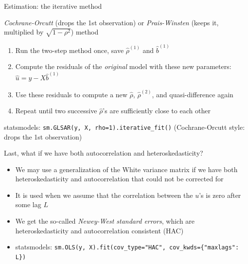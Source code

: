 \documentclass[aspectratio=169]{beamer}
\begin{document}
\begin{frame}{Estimation: the iterative method}

\textit{Cochrane-Orcutt} (drops the 1st observation) or \textit{Prais-Winsten} (keeps it, multiplied by $\sqrt{1-\rho^2}$) method

\begin{enumerate}
    \item Run the two-step method once, save $\hat{\rho}^{(1)}$ and $\hat{b}^{(1)}$
    \item Compute the residuals of the \textit{original} model with these new parameters: $\hat{u} = y - X\hat{b}^{(1)}$
    \item Use these residuals to compute a new $\hat{\rho}$, $\hat{\rho}^{(2)}$, and quasi-difference again
    \item Repeat until two successive $\hat{\rho}$'s are sufficiently close to each other
\end{enumerate}

statsmodels: \texttt{sm.GLSAR(y, X, rho=1).iterative\_fit()} (Cochrane-Orcutt style: drops the 1st observation)

\end{frame}

\begin{frame}{Last, what if we have both autocorrelation and heteroskedasticity?}

\begin{itemize}
    \item We may use a generalization of the White variance matrix if we have both heteroskedasticity and autocorrelation that could not be corrected for
    \item It is used when we assume that the correlation between the $u$'s is zero after some lag $L$
    \item We get the so-called \textit{Newey-West standard errors}, which are heteroskedasticity and autocorrelation consistent (HAC)
    \item statsmodels: \texttt{sm.OLS(y, X).fit(cov\_type="HAC", cov\_kwds=\{"maxlags": L\})}
\end{itemize}

\end{frame}
\end{document}
